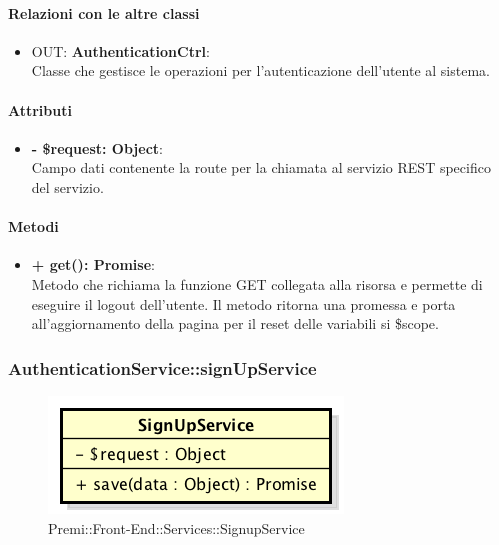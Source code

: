 		\paragraph{Relazioni con le altre classi}
		\begin{itemize}
			\item OUT: \textbf{AuthenticationCtrl}:\\
			Classe che gestisce le operazioni per l'autenticazione dell'utente al sistema.
		\end{itemize}
		
		\paragraph{Attributi}
		\begin{itemize}
			\item \textbf{- \$request: Object}:\\
			Campo dati contenente la route per la chiamata al servizio REST specifico del servizio.
		\end{itemize}	
		
		\paragraph{Metodi}
		\begin{itemize}
			\item \textbf{+ get(): Promise}:\\
			Metodo che richiama la funzione GET collegata alla risorsa e permette di eseguire il logout dell'utente. Il metodo ritorna una promessa e porta all'aggiornamento della pagina per il reset delle variabili si \$scope.
		\end{itemize}
\newpage
		
		
		\subsubsection{AuthenticationService::signUpService}
		\begin{figure}[h]
			\centering
				\includegraphics[width=0.4\linewidth]{img/premi_front_end_services_signupservice}
			\caption[Premi::Front-End::Services::SignupService]{Premi::Front-End::Services::SignupService}
		\end{figure}
		
